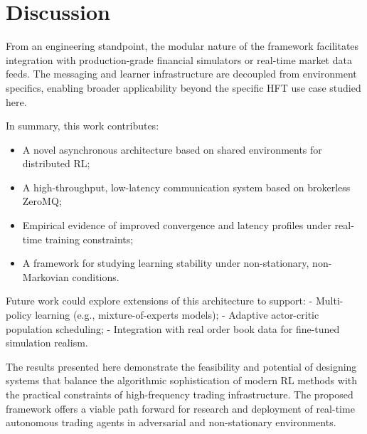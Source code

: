 \section{Discussion}
\label{sec:discussion}

From an engineering standpoint, the modular nature of the framework facilitates integration with production-grade financial simulators or real-time market data feeds.
The messaging and learner infrastructure are decoupled from environment specifics, enabling broader applicability beyond the specific HFT use case studied here.

In summary, this work contributes:
\begin{itemize}
    \item A novel asynchronous architecture based on shared environments for distributed RL;
    \item A high-throughput, low-latency communication system based on brokerless ZeroMQ;
    \item Empirical evidence of improved convergence and latency profiles under real-time training constraints;
    \item A framework for studying learning stability under non-stationary, non-Markovian conditions.
\end{itemize}

Future work could explore extensions of this architecture to support:
- Multi-policy learning (e.g., mixture-of-experts models);
- Adaptive actor-critic population scheduling;
- Integration with real order book data for fine-tuned simulation realism.

The results presented here demonstrate the feasibility and potential of designing systems that balance the algorithmic sophistication of
modern RL methods with the practical constraints of high-frequency trading infrastructure.
The proposed framework offers a viable path forward for research and deployment of real-time autonomous trading agents in adversarial and non-stationary environments.

